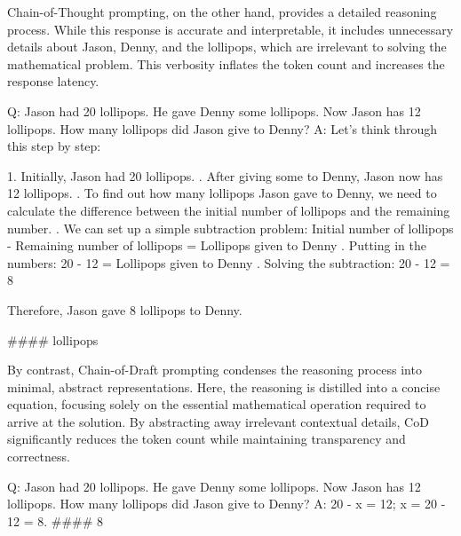 Chain-of-Thought prompting, on the other hand, provides a detailed reasoning process.
While this response is accurate and interpretable, it includes unnecessary details about Jason, Denny, and the lollipops, which are irrelevant to solving the mathematical problem. This verbosity inflates the token count and increases the response latency.

\begin{center}
\begin{promptbox}
Q: Jason had 20 lollipops. He gave Denny some lollipops. Now Jason has 12
lollipops. How many lollipops did Jason give to Denny?
\newline
A: Let's think through this step by step:

1. Initially, Jason had 20 lollipops. . After giving some to Denny, Jason now has 12 lollipops. . To find out how many lollipops Jason gave to Denny, we need to calculate the difference between the initial number of lollipops and the remaining number. . We can set up a simple subtraction problem:
   Initial number of lollipops - Remaining number of lollipops = Lollipops given to Denny . Putting in the numbers:
   20 - 12 = Lollipops given to Denny . Solving the subtraction:
   20 - 12 = 8

Therefore, Jason gave 8 lollipops to Denny.

\#\#\#\# lollipops
\end{promptbox}
\end{center}

By contrast, Chain-of-Draft prompting condenses the reasoning process into minimal, abstract representations. Here, the reasoning is distilled into a concise equation, focusing solely on the essential mathematical operation required to arrive at the solution. By abstracting away irrelevant contextual details, CoD significantly reduces the token count while maintaining transparency and correctness.

\begin{center}
\begin{promptbox}
Q: Jason had 20 lollipops. He gave Denny some lollipops. Now Jason has 12
lollipops. How many lollipops did Jason give to Denny?
\newline
A: 20 - x = 12; x = 20 - 12 = 8. \#\#\#\# 8
\end{promptbox}
\end{center}










